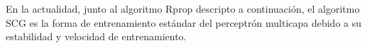 En la actualidad, junto al algoritmo Rprop descripto a continuación,
el algoritmo SCG es la forma de entrenamiento estándar del perceptrón
multicapa debido a su estabilidad y velocidad de entrenamiento.


